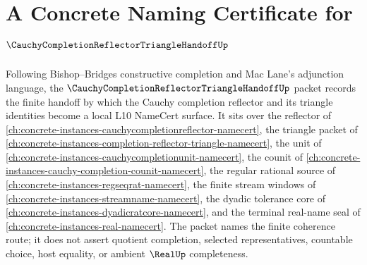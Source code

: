 \chapter{A Concrete Naming Certificate for $\CauchyCompletionReflectorTriangleHandoffUp$}
\label{ch:concrete-instances-cauchy-completion-reflector-triangle-handoff-namecert}

Following Bishop--Bridges constructive completion and Mac Lane's adjunction language, the $\CauchyCompletionReflectorTriangleHandoffUp$ packet records the finite handoff by which the Cauchy completion reflector and its triangle identities become a local L10 NameCert surface. It sits over the reflector of \autoref{ch:concrete-instances-cauchycompletionreflector-namecert}, the triangle packet of \autoref{ch:concrete-instances-completion-reflector-triangle-namecert}, the unit of \autoref{ch:concrete-instances-cauchycompletionunit-namecert}, the counit of \autoref{ch:concrete-instances-cauchy-completion-counit-namecert}, the regular rational source of \autoref{ch:concrete-instances-regseqrat-namecert}, the finite stream windows of \autoref{ch:concrete-instances-streamname-namecert}, the dyadic tolerance core of \autoref{ch:concrete-instances-dyadicratcore-namecert}, and the terminal real-name seal of \autoref{ch:concrete-instances-real-namecert}. The packet names the finite coherence route; it does not assert quotient completion, selected representatives, countable choice, host equality, or ambient $\RealUp$ completeness.

